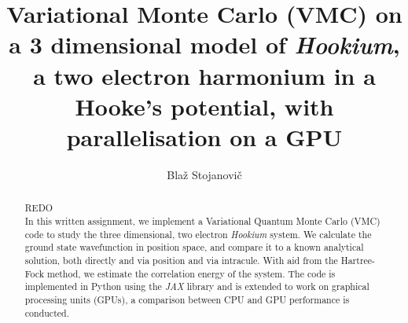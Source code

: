 \documentclass[final,3p,times,twocolumn]{elsarticle}
\begin{document}
	
	\begin{frontmatter}
		
		
		
		\title{Variational Monte Carlo (VMC) on a 3 dimensional model of \emph{Hookium}, a two electron harmonium in a Hooke’s potential, with parallelisation on a GPU}
		
		
		\author{Bla\v z Stojanovi\v c}
		
		\address{Cavendish Laboratory, Department of Physics, J J Thomson
			Avenue, Cambridge. CB3 0HE}
		
		\begin{abstract}
			REDO  \\
			In this written assignment, we implement a Variational Quantum Monte Carlo (VMC) code to study the three dimensional, two electron \emph{Hookium} system. We calculate the ground state wavefunction in position space, and compare it to a known analytical solution, both directly and via position and via intracule. With aid from the Hartree-Fock method, we estimate the correlation energy of the system. The code is implemented in Python using the \emph{JAX} library and is extended to work on graphical processing units (GPUs), a comparison between CPU and GPU performance is conducted.
		\end{abstract}
		
	\end{frontmatter}
	
	
\end{document}
